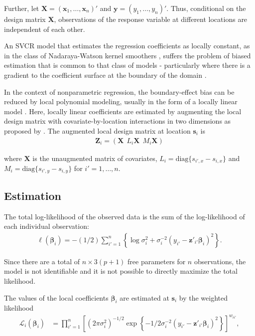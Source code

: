 \documentclass[authoryear, review, 11pt]{elsarticle}
\begin{document}
	Further, let $\bm{X} = \left( \bm{x}_1, \dots, \bm{x}_n \right)'$ and $\bm{y} = \left( y_1, \dots, y_n \right)'$. Thus, conditional on the design matrix $\bm{X}$, observations of the response variable at different locations are independent of each other.
  
  An SVCR model that estimates the regression coefficients as locally constant, as in the class of Nadaraya-Watson kernel smoothers \citep{Hardle-1990}, suffers the problem of biased estimation that is common to that class of models - particularly where there is a gradient to the coefficient surface at the boundary of the domain \citep{Hastie:1993b}.

  In the context of nonparametric regression, the boundary-effect bias can be reduced by local polynomial modeling, usually in the form of a locally linear model \citep{Fan-1996}. Here, locally linear coefficients are estimated by augmenting the local design matrix with covariate-by-location interactions in two dimensions as proposed by \cite{Wang:2008b}. The augmented local design matrix at location $\bm{s}_i$ is
  \begin{align}
		\bm{Z}_i = \left( \bm{X}  \:\: L_i \bm{X} \:\: M_i \bm{X} \right)
	\end{align} 
  
	where $\bm{X}$ is the unaugmented matrix of covariates, $L_i = \text{diag}\{s_{i',x} - s_{i,x}\}$ and $M_i = \text{diag}\{s_{i',y} - s_{i,y}\}$ for $i' = 1, \dots, n$.
  
  \subsection{Estimation}		
  The total log-likelihood of the observed data is the sum of the log-likelihood of each individual observation:
  \begin{align} \label{eq:coefficients}
  	\ell(\bm{\beta}_i) = -(1/2) \sum_{i'=1}^n \left\{ \log{\sigma^2_i}  + \sigma^{-2}_i  \left(y_{i'} - \bm{z}'_{i'} \bm{\beta}_i \right)^2 \right\}.
	\end{align}
	
	Since there are a total of $n \times 3(p+1)$ free parameters for $n$ observations, the model is not identifiable and it is not possible to directly maximize the total likelihood.
  
  The values of the local coefficients $\bm{\beta}_i$ are estimated at $\bm{s}_i$ by the weighted likelihood
  \begin{align}\label{eq:local-likelihood}
		\mathcal{L}_i \left(\bm{\beta}_i \right) &= \prod_{i'=1}^n \left[ \left(2 \pi \sigma^2_i  \right)^{-1/2}  \exp\left\{- 1/2 \sigma^{-2}_i  \left(y_{i'} - \bm{z}'_{i'} \bm{\beta}_i \right)^2 \right\} \right] ^ {w_{ii'}},
	\end{align}
  
\end{document}
